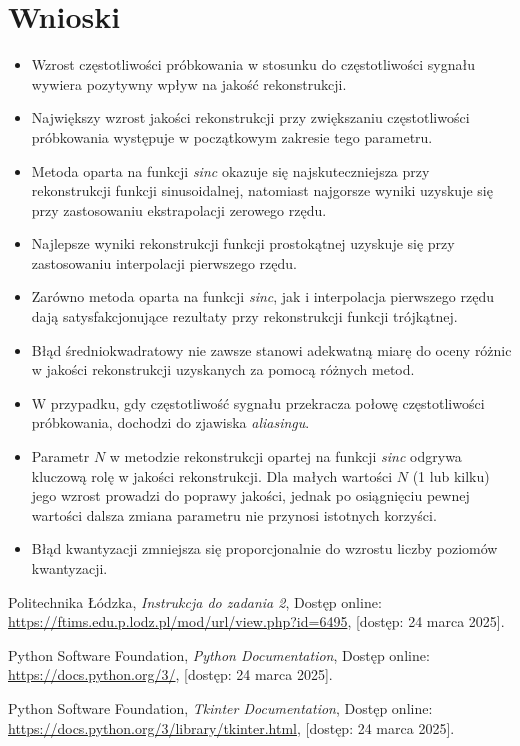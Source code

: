 \documentclass{article}
\begin{document}
\section{Wnioski}
\begin{itemize}
    \item Wzrost częstotliwości próbkowania w stosunku do częstotliwości sygnału wywiera pozytywny wpływ na jakość rekonstrukcji.
    \item Największy wzrost jakości rekonstrukcji przy zwiększaniu częstotliwości próbkowania występuje w początkowym zakresie tego parametru.
    \item Metoda oparta na funkcji \emph{sinc} okazuje się najskuteczniejsza przy rekonstrukcji funkcji sinusoidalnej, natomiast najgorsze wyniki uzyskuje się przy zastosowaniu ekstrapolacji zerowego rzędu.
    \item Najlepsze wyniki rekonstrukcji funkcji prostokątnej uzyskuje się przy zastosowaniu interpolacji pierwszego rzędu.
    \item Zarówno metoda oparta na funkcji \emph{sinc}, jak i interpolacja pierwszego rzędu dają satysfakcjonujące rezultaty przy rekonstrukcji funkcji trójkątnej.
    \item Błąd średniokwadratowy nie zawsze stanowi adekwatną miarę do oceny różnic w jakości rekonstrukcji uzyskanych za pomocą różnych metod.
    \item W przypadku, gdy częstotliwość sygnału przekracza połowę częstotliwości próbkowania, dochodzi do zjawiska \emph{aliasingu}.
    \item Parametr $N$ w metodzie rekonstrukcji opartej na funkcji \emph{sinc} odgrywa kluczową rolę w jakości rekonstrukcji. Dla małych wartości $N$ (1 lub kilku) jego wzrost prowadzi do poprawy jakości, jednak po osiągnięciu pewnej wartości dalsza zmiana parametru nie przynosi istotnych korzyści.
    \item Błąd kwantyzacji zmniejsza się proporcjonalnie do wzrostu liczby poziomów kwantyzacji.
\end{itemize}


\begin{thebibliography}{9}

    Politechnika Łódzka, 
    \emph{Instrukcja do zadania 2}, 
    Dostęp online: \url{https://ftims.edu.p.lodz.pl/mod/url/view.php?id=6495}, 
    [dostęp: 24 marca 2025].


    Python Software Foundation, 
    \emph{Python Documentation}, 
    Dostęp online: \url{https://docs.python.org/3/}, 
    [dostęp: 24 marca 2025].

    Python Software Foundation, 
    \emph{Tkinter Documentation}, 
    Dostęp online: \url{https://docs.python.org/3/library/tkinter.html}, 
    [dostęp: 24 marca 2025].

\end{thebibliography}
\end{document}
